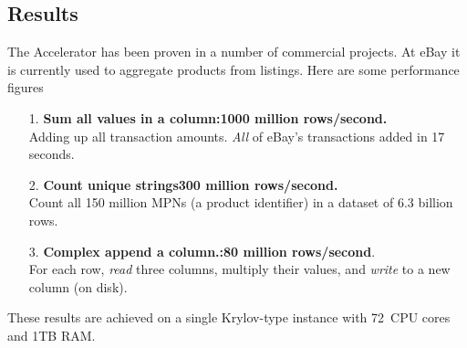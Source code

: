 \documentclass[a4paper]{article}
\begin{document}
\subsection*{Results}
The Accelerator has been proven in a number of commercial projects.
At eBay it is currently used to aggregate products from listings.
Here are some performance figures
\begin{itemize}
\item[1.]  \textbf{Sum all values in a column:\hfill 1000 million rows/second.}\\
  Adding up all transaction amounts.  \textsl{All} of eBay's
  transactions added in 17 seconds.
\item[2.]  \textbf{Count unique strings\hfill  300 million rows/second.}\\
Count all 150 million MPNs (a product identifier) in a dataset of 6.3
billion rows.
\item[3.]  \textbf{Complex append a column.:\hfill 80 million rows/second}.\\
  For each row, \textsl{read} three columns, multiply their values,
  and \textsl{write} to a new column (on disk).
\end{itemize}

\noindent These results are achieved on a single Krylov-type instance with
72~CPU cores and 1TB RAM.









\end{document}
